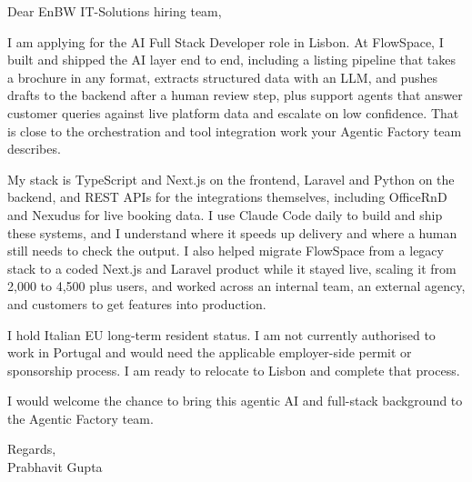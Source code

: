 \documentclass[a4paper,11pt]{article}
\begin{document}
Dear EnBW IT-Solutions hiring team,

I am applying for the AI Full Stack Developer role in Lisbon. At FlowSpace, I built and shipped the AI layer end to end, including a listing pipeline that takes a brochure in any format, extracts structured data with an LLM, and pushes drafts to the backend after a human review step, plus support agents that answer customer queries against live platform data and escalate on low confidence. That is close to the orchestration and tool integration work your Agentic Factory team describes.

My stack is TypeScript and Next.js on the frontend, Laravel and Python on the backend, and REST APIs for the integrations themselves, including OfficeRnD and Nexudus for live booking data. I use Claude Code daily to build and ship these systems, and I understand where it speeds up delivery and where a human still needs to check the output. I also helped migrate FlowSpace from a legacy stack to a coded Next.js and Laravel product while it stayed live, scaling it from 2,000 to 4,500 plus users, and worked across an internal team, an external agency, and customers to get features into production.

I hold Italian EU long-term resident status. I am not currently authorised to work in Portugal and would need the applicable employer-side permit or sponsorship process. I am ready to relocate to Lisbon and complete that process.

I would welcome the chance to bring this agentic AI and full-stack background to the Agentic Factory team.

Regards,\\
Prabhavit Gupta
\end{document}
